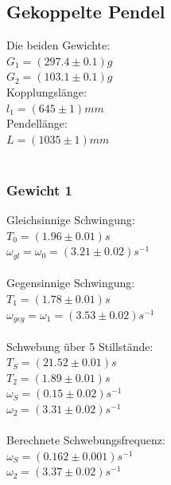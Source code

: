 \documentclass{article}
\begin{document}
\subsection{Gekoppelte Pendel}
Die beiden Gewichte:\\
$G_1=(297.4 \pm 0.1)\si{g}$\\
$G_2=(103.1 \pm 0.1)\si{g}$\\
Kopplungslänge:\\
$l_1=(645 \pm 1)\si{mm}$\\
Pendellänge:\\
$L=(1035 \pm 1)\si{mm}$\\
\\
\subsubsection{Gewicht 1}
Gleichsinnige Schwingung:\\
$T_0=(1.96 \pm 0.01)\si{s}$\\
$\omega_{gl}=\omega_0=(3.21 \pm 0.02)\si{s^{-1}}$\\
\\
Gegensinnige Schwingung:\\
$T_1=(1.78 \pm 0.01)\si{s}$\\
$\omega_{geg}=\omega_1=(3.53 \pm 0.02)\si{s^{-1}}$\\
\\
Schwebung über 5 Stillstände:\\
$T_S=(21.52 \pm 0.01)\si{s}$\\
$T_2=(1.89 \pm 0.01)\si{s}$\\
$\omega_S=(0.15 \pm 0.02)\si{s^{-1}}$\\
$\omega_2=(3.31 \pm 0.02)\si{s^{-1}}$\\
\\
Berechnete Schwebungsfrequenz:\\
$\omega_S=(0.162 \pm 0.001)\si{s^{-1}}$\\
$\omega_2=(3.37 \pm 0.02)\si{s^{-1}}$\\
\\
\end{document}

